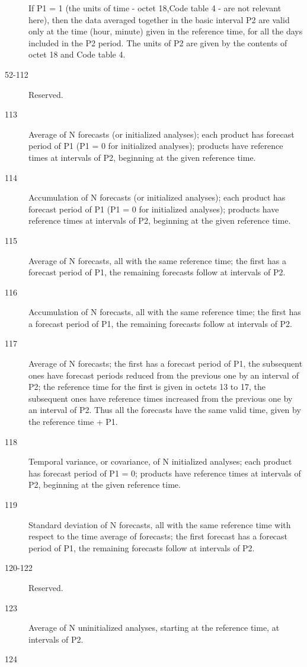 \documentclass[draft,12pt,a4paper,twoside]{book}
\begin{document}
\begin{description}
  If P1 = 1 (the units of time - octet 18,Code table 4 - are not relevant
  here), then the data averaged together in the basic interval P2 are valid
  only at the time (hour, minute) given in the reference time, for all the days
  included in the P2 period. The units of P2  are given by the contents of
  octet 18 and Code table 4.
\item [52-112] Reserved.
\item [113]
  Average of N forecasts (or initialized analyses); each product has forecast
  period of P1 (P1 = 0 for initialized analyses); products have reference
  times at intervals of P2, beginning at the given reference time.
\item [114]
  Accumulation of N forecasts (or initialized analyses); each product has
  forecast period of P1 (P1 = 0 for initialized analyses); products have
  reference times at intervals of P2, beginning at the given reference time.
\item [115]
  Average of N forecasts, all with the same reference time; the first has a
  forecast period of P1, the remaining forecasts follow at intervals of P2.
\item [116]
  Accumulation of N forecasts, all with the same reference time; the first has
  a forecast period of P1, the remaining forecasts follow at intervals of P2.
\item [117]
  Average of N forecasts; the first has a forecast period of P1, the
  subsequent ones have forecast periods reduced from the previous one by an
  interval of P2; the reference time for the first is given in octets 13 to 17,
  the subsequent ones have reference times increased from the previous one by
  an interval of P2. Thus all the forecasts have the same valid time, given by
  the reference time + P1.
\item [118]
  Temporal variance, or covariance, of N initialized analyses; each product has
  forecast period of P1  = 0; products have reference times at intervals of P2,
  beginning at the given reference time.
\item [119]
  Standard deviation of N forecasts, all with the same reference time with
  respect to the time average of forecasts; the first forecast has a forecast
  period of P1, the remaining forecasts follow at intervals of P2.
\item [120-122] Reserved.
\item [123]
  Average of N uninitialized analyses, starting at the reference time, at
  intervals of P2.
\item [124]

\end{description}
\end{document}
